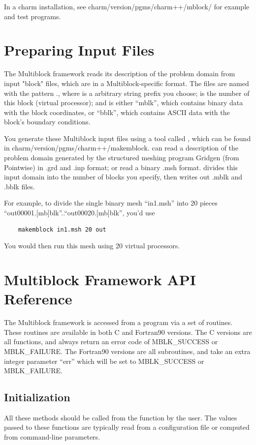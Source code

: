 \documentclass[10pt]{article}
\begin{document}
In a charm installation, see charm/version/pgms/charm++/mblock/
for example and test programs.

\section{Preparing Input Files}
The Multiblock framework reads its description of the problem
domain from input "block" files, which are in a Multiblock-specific format.
The files are named with the pattern ., where
 is a arbitrary string prefix you choose;  is the 
number of this block (virtual processor); and  is either ``mblk'',
which contains binary data with the block coordinates, or ``bblk'', 
which contains ASCII data with the block's boundary conditions.

You generate these Multiblock input files using a tool called ,
which can be found in charm/version/pgms/charm++/makemblock.
 can read a description of the problem domain 
generated by the structured meshing program Gridgen (from Pointwise)
in .grd and .inp format; or read a binary .msh format.
 divides this input domain into the number of blocks
you specify, then writes out .mblk and .bblk files.

For example, to divide the single binary mesh ``in1.msh'' into
20 pieces ``out00001.[mb]blk''..``out00020.[mb]blk'', you'd use
\begin{verbatim}
	makemblock in1.msh 20 out
\end{verbatim}

You would then run this mesh using 20 virtual processors.


\section{Multiblock Framework API Reference}

The Multiblock framework is accessed from a program via a set of routines.
These routines are available in both C and Fortran90 versions.
The C versions are all functions, and always return an error code of 
MBLK\_SUCCESS or MBLK\_FAILURE.
The Fortran90 versions are all subroutines, and take an extra integer
parameter ``err'' which will be set to MBLK\_SUCCESS or MBLK\_FAILURE.

\subsection{Initialization}
All these methods should be called from the  function by the user. 
The values passed to these functions are typically read from a configuration 
file or computed from command-line parameters.
\end{document}
